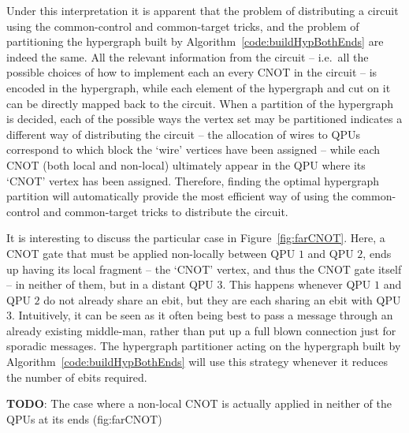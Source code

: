Under this interpretation it is apparent that the problem of distributing a circuit using the common-control and common-target tricks, and the problem of partitioning the hypergraph built by Algorithm~\ref{code:buildHypBothEnds} are indeed the same. All the relevant information from the circuit -- i.e.\ all the possible choices of how to implement each an every CNOT in the circuit -- is encoded in the hypergraph, while each element of the hypergraph and cut on it can be directly mapped back to the circuit. When a partition of the hypergraph is decided, each of the possible ways the vertex set may be partitioned indicates a different way of distributing the circuit -- the allocation of wires to QPUs correspond to which block the `wire' vertices have been assigned -- while each CNOT (both local and non-local) ultimately appear in the QPU where its `CNOT' vertex has been assigned. Therefore, finding the optimal hypergraph partition will automatically provide the most efficient way of using the common-control and common-target tricks to distribute the circuit.

It is interesting to discuss the particular case in Figure~\ref{fig:farCNOT}. Here, a CNOT gate that must be applied non-locally between QPU \(1\) and QPU \(2\), ends up having its local fragment -- the `CNOT' vertex, and thus the CNOT gate itself --  in neither of them, but in a distant QPU \(3\). This happens whenever QPU \(1\) and QPU \(2\) do not already share an ebit, but they are each sharing an ebit with QPU \(3\). Intuitively, it can be seen as it often being best to pass a message through an already existing middle-man, rather than put up a full blown connection just for sporadic messages. The hypergraph partitioner acting on the hypergraph built by Algorithm~\ref{code:buildHypBothEnds} will use this strategy whenever it reduces the number of ebits required.

\textbf{TODO}: The case where a non-local CNOT is actually applied in neither of the QPUs at its ends (fig:farCNOT)

